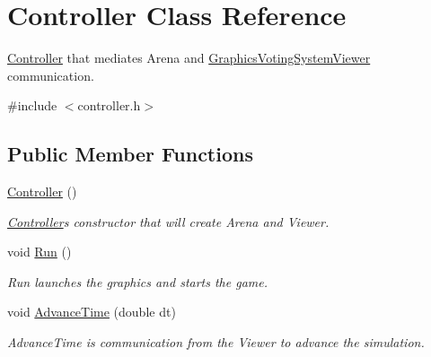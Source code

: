 \hypertarget{classController}{}\section{Controller Class Reference}
\label{classController}


\hyperlink{classController}{Controller} that mediates Arena and \hyperlink{classGraphicsVotingSystemViewer}{Graphics\+Voting\+System\+Viewer} communication.  




{\ttfamily \#include $<$controller.\+h$>$}

\subsection*{Public Member Functions}
\begin{DoxyCompactItemize}
\item 
\mbox{\label{classController_a95c56822d667e94b031451729ce069a9}} 
\hyperlink{classController_a95c56822d667e94b031451729ce069a9}{Controller} ()
\begin{DoxyCompactList}\small\item\em \hyperlink{classController}{Controller}\textquotesingle{}s constructor that will create Arena and Viewer. \end{DoxyCompactList}\item 
\mbox{\label{classController_a17abb2cec6c0109e9b2df3cdc082eaad}} 
void \hyperlink{classController_a17abb2cec6c0109e9b2df3cdc082eaad}{Run} ()
\begin{DoxyCompactList}\small\item\em Run launches the graphics and starts the game. \end{DoxyCompactList}\item 
\mbox{\label{classController_a6a4a3eaee03f6c4718da3f8293d7e053}} 
void \hyperlink{classController_a6a4a3eaee03f6c4718da3f8293d7e053}{Advance\+Time} (double dt)
\begin{DoxyCompactList}\small\item\em Advance\+Time is communication from the Viewer to advance the simulation. \end{DoxyCompactList}\item 
\mbox{\label{classController_a55b8d46984535adb91f40309914e8852}} 

\end{DoxyCompactItemize}
